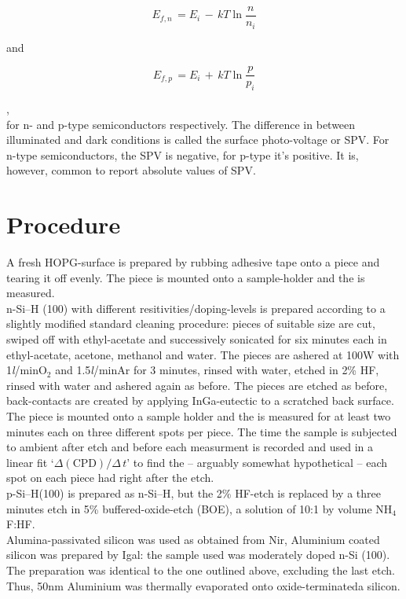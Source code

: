 \documentclass[a4paper,10pt]{article}
\newcommand{\sih}{Si--H}
\newcommand{\cpd}{\text{CPD}}
\newcommand{\hopg}{HOPG}
\newcommand{\spv}{SPV}
\newcommand{\litmin}{\emph{l}/min}
\begin{document}
\begin{minipage}[c]{0.4\textwidth}
	\begin{equation}
	E_{f,n} \, =  E_i \, - \, kT \ln{\frac{n}{n_i}}
	\end{equation}
\end{minipage}	
\hfill
and
\hfill
\begin{minipage}[c]{0.4\textwidth}
	\begin{equation}
	E_{f,p} \, = E_i \, + \, kT \ln{\frac{p}{p_i}}
	\end{equation}
\end{minipage},\\
for n- and p-type semiconductors respectively. The difference in \cpd{} between illuminated and dark conditions is called the surface photo-voltage or \spv{}. For n-type semiconductors, the \spv{} is negative, for p-type it\rq{}s positive. It is, however, common to report absolute values of \spv{}. 


\section{Procedure}
A fresh \hopg{}-surface is prepared by rubbing adhesive tape onto a piece and tearing it off evenly. The piece is mounted onto a sample-holder and the \cpd{} is measured.\\
n-\sih{} (100) with different resitivities/doping-levels is prepared according to a slightly modified standard cleaning procedure: pieces of suitable size are cut, swiped off with ethyl-acetate and successively sonicated for six minutes each in ethyl-acetate, acetone, methanol and water. The pieces are ashered at 100W with 1\litmin O$_2$ and 1.5\litmin Ar for 3 minutes, rinsed with water, etched in 2\% HF, rinsed with water and ashered again as before. The pieces are etched as before, back-contacts are created by applying InGa-eutectic to a scratched back surface. The piece is mounted onto a sample holder and the \cpd{} is measured for at least two minutes each on three different spots per piece. The time the sample is subjected to ambient after etch and before each measurment is recorded and used in a linear fit \lq{}$\Delta (\cpd{})/\Delta \, t$\rq{} to find the -- arguably somewhat hypothetical -- \cpd{} each spot on each piece had right after the etch.\\
p-\sih{}(100) is prepared as n-\sih{}, but the 2\% HF-etch is replaced by a three minutes etch in 5\% buffered-oxide-etch (BOE), a solution of 10:1 by volume NH$_4$F:HF.\\
Alumina-passivated silicon was used as obtained from Nir, 
Aluminium coated silicon was prepared by Igal: the sample used was moderately doped n-Si (100). The preparation was identical to the one outlined above, excluding the last etch. Thus, 50nm Aluminium was thermally evaporated onto oxide-terminateda silicon. 
\end{document}
